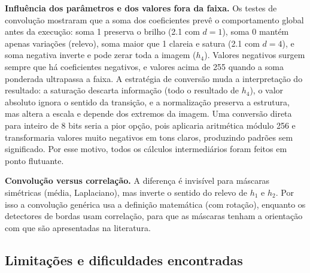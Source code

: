\documentclass[11pt,a4paper]{article}
\begin{document}
\textbf{Influência dos parâmetros e dos valores fora da faixa.} Os testes de convolução mostraram
que a soma dos coeficientes prevê o comportamento global antes da execução: soma 1 preserva o
brilho (2.1 com $d = 1$), soma 0 mantém apenas variações (relevo), soma maior que 1 clareia e
satura (2.1 com $d = 4$), e soma negativa inverte e pode zerar toda a imagem ($h_4$). Valores
negativos surgem sempre que há coeficientes negativos, e valores acima de 255 quando a soma
ponderada ultrapassa a faixa. A estratégia de conversão muda a interpretação do resultado: a
saturação descarta informação (todo o resultado de $h_4$), o valor absoluto ignora o sentido da
transição, e a normalização preserva a estrutura, mas altera a escala e depende dos extremos da
imagem. Uma conversão direta para inteiro de 8 bits seria a pior opção, pois aplicaria aritmética
módulo 256 e transformaria valores muito negativos em tons claros, produzindo padrões sem
significado. Por esse motivo, todos os cálculos intermediários foram feitos em ponto flutuante.

\textbf{Convolução versus correlação.} A diferença é invisível para máscaras simétricas
(média, Laplaciano), mas inverte o sentido do relevo de $h_1$ e $h_2$. Por isso a convolução
genérica usa a definição matemática (com rotação), enquanto os detectores de bordas usam
correlação, para que as máscaras tenham a orientação com que são apresentadas na literatura.

\subsection{Limitações e dificuldades encontradas}
\end{document}
